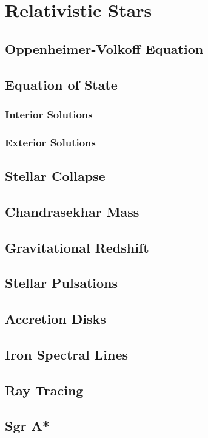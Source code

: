 \setchapterpreamble[u]{\margintoc}
\chapter{Relativistic Stars}

\section{Oppenheimer-Volkoff Equation}

\section{Equation of State}
\subsection{Interior Solutions}
\subsection{Exterior Solutions}

\section{Stellar Collapse}
\section{Chandrasekhar Mass}
\section{Gravitational Redshift}

\section{Stellar Pulsations}

\section{Accretion Disks}
\section{Iron Spectral Lines}
\section{Ray Tracing}
\section{Sgr A*}